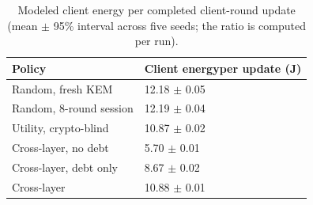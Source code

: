 \begin{table}[!ht]
\caption{Modeled client energy per completed client-round update (mean $\pm$ 95\% interval across five seeds; the ratio is computed per run).}
\label{tab:energy-per-update}
\centering
\setlength{\tabcolsep}{2pt}
\begin{tabular}{|p{}|p{}|}
\hline
Policy & Client energy\newline{}per update (J) \\
\hline
Random, fresh KEM & 12.18 $\pm$ 0.05 \\
\hline
Random, 8-round session & 12.19 $\pm$ 0.04 \\
\hline
Utility, crypto-blind & 10.87 $\pm$ 0.02 \\
\hline
Cross-layer, no debt & 5.70 $\pm$ 0.01 \\
\hline
Cross-layer, debt only & 8.67 $\pm$ 0.02 \\
\hline
Cross-layer & 10.88 $\pm$ 0.01 \\
\hline
\end{tabular}
\end{table}
